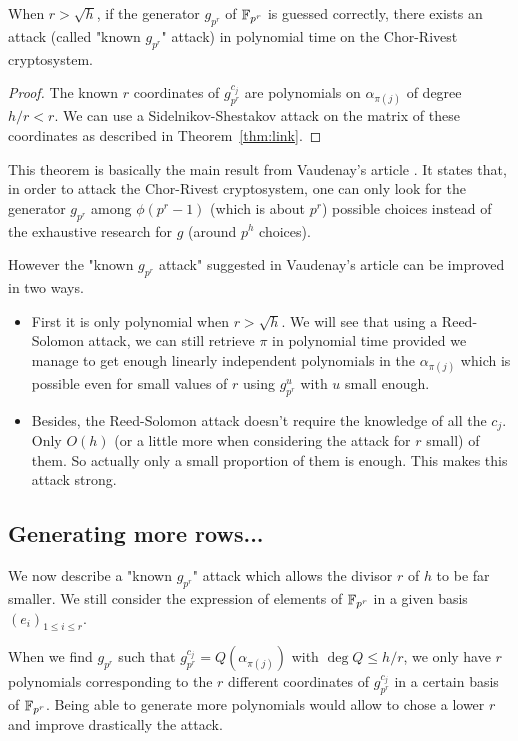 \documentclass[a4paper]{article}
\newcommand{\GF}[1]{\F_{#1}}
\begin{document}
\begin{theorem}
When $r > \sqrt{h}$, if the generator $g_{p^r}$ of $\GF{p^r}$ is guessed correctly, there exists an attack (called "known $g_{p^r}$" attack) in polynomial time on the Chor-Rivest cryptosystem.
\end{theorem}
\begin{proof}
The known $r$ coordinates of $g_{p^r}^{c_j}$ are polynomials on $\alpha_{\pi(j)}$ of degree $h/r < r$. We can use a Sidelnikov-Shestakov attack on the matrix of these coordinates as described in Theorem~\ref{thm:link}.
\end{proof}

This theorem is basically the main result from Vaudenay's article \cite{Vau01}. It states that, in order to attack the Chor-Rivest cryptosystem, one can only look for the generator $g_{p^r}$ among $\phi(p^r-1)$ (which is about $p^r$) possible choices instead of the exhaustive research for $g$ (around $p^h$ choices).

However the "known $g_{p^r}$ attack" suggested in Vaudenay's article can be improved in two ways.

\begin{itemize}
\item First it is only polynomial when $r > \sqrt{h}$. We will see that using a Reed-Solomon attack, we can still retrieve $\pi$ in polynomial time provided we manage to get enough linearly independent polynomials in the $\alpha_{\pi(j)}$ which is possible even for small values of $r$ using $g_{p^r}^u$ with $u$ small enough.
\item Besides, the Reed-Solomon attack doesn't require the knowledge of all the $c_j$. Only $O(h)$ (or a little more when considering the attack for $r$ small) of them. So actually only a small proportion of them is enough. This makes this attack strong.
\end{itemize}




\subsection{Generating more rows...}

We now describe a "known $g_{p^r}$" attack which allows the divisor $r$ of $h$ to be far smaller.
We still consider the expression of elements of $\mathbb{F}_{p^r}$ in a given basis $(e_i)_{1 \leq i \leq r}$.


When we find $g_{p^r}$ such that $g_{p^r}^{c_j} = Q(\alpha_{\pi(j)})$ with $\deg Q \leq h/r$, we only have $r$ polynomials corresponding to the $r$ different coordinates of $g_{p^r}^{c_j}$ in a certain basis of $\mathbb{F}_{p^r}$. Being able to generate more polynomials would allow to chose a lower $r$ and improve drastically the attack.
\end{document}
